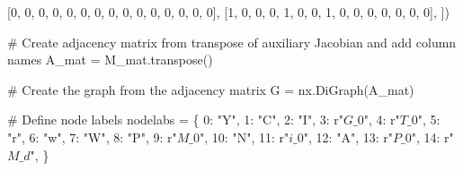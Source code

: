 \documentclass[
  letterpaper,
  DIV=11,
  numbers=noendperiod]{scrreprt}
\newenvironment{Shaded}{\begin{snugshade}}{\end{snugshade}}
\newcommand{\CommentTok}[1]{\textcolor[rgb]{0.37,0.37,0.37}{#1}}
\newcommand{\DecValTok}[1]{\textcolor[rgb]{0.68,0.00,0.00}{#1}}
\newcommand{\NormalTok}[1]{\textcolor[rgb]{0.00,0.23,0.31}{#1}}
\newcommand{\OperatorTok}[1]{\textcolor[rgb]{0.37,0.37,0.37}{#1}}
\newcommand{\StringTok}[1]{\textcolor[rgb]{0.13,0.47,0.30}{#1}}
\newcommand{\VerbatimStringTok}[1]{\textcolor[rgb]{0.13,0.47,0.30}{#1}}
\begin{document}
\begin{tcolorbox}
\begin{Shaded}
\begin{Highlighting}[]
\NormalTok{    [}\DecValTok{0}\NormalTok{, }\DecValTok{0}\NormalTok{, }\DecValTok{0}\NormalTok{, }\DecValTok{0}\NormalTok{, }\DecValTok{0}\NormalTok{, }\DecValTok{0}\NormalTok{, }\DecValTok{0}\NormalTok{, }\DecValTok{0}\NormalTok{, }\DecValTok{0}\NormalTok{, }\DecValTok{0}\NormalTok{, }\DecValTok{0}\NormalTok{, }\DecValTok{0}\NormalTok{, }\DecValTok{0}\NormalTok{, }\DecValTok{0}\NormalTok{, }\DecValTok{0}\NormalTok{],}
\NormalTok{    [}\DecValTok{1}\NormalTok{, }\DecValTok{0}\NormalTok{, }\DecValTok{0}\NormalTok{, }\DecValTok{0}\NormalTok{, }\DecValTok{1}\NormalTok{, }\DecValTok{0}\NormalTok{, }\DecValTok{0}\NormalTok{, }\DecValTok{1}\NormalTok{, }\DecValTok{0}\NormalTok{, }\DecValTok{0}\NormalTok{, }\DecValTok{0}\NormalTok{, }\DecValTok{0}\NormalTok{, }\DecValTok{0}\NormalTok{, }\DecValTok{0}\NormalTok{, }\DecValTok{0}\NormalTok{],}
\NormalTok{])}

\CommentTok{\# Create adjacency matrix from transpose of auxiliary Jacobian and add column names}
\NormalTok{A\_mat }\OperatorTok{=}\NormalTok{ M\_mat.transpose()}

\CommentTok{\# Create the graph from the adjacency matrix}
\NormalTok{G }\OperatorTok{=}\NormalTok{ nx.DiGraph(A\_mat)}


\CommentTok{\# Define node labels}
\NormalTok{nodelabs }\OperatorTok{=}\NormalTok{ \{}
    \DecValTok{0}\NormalTok{: }\StringTok{"Y"}\NormalTok{,}
    \DecValTok{1}\NormalTok{: }\StringTok{"C"}\NormalTok{,}
    \DecValTok{2}\NormalTok{: }\StringTok{"I"}\NormalTok{,}
    \DecValTok{3}\NormalTok{: }\VerbatimStringTok{r"$G\_0$"}\NormalTok{,}
    \DecValTok{4}\NormalTok{: }\VerbatimStringTok{r"$T\_0$"}\NormalTok{,}
    \DecValTok{5}\NormalTok{: }\StringTok{"r"}\NormalTok{,}
    \DecValTok{6}\NormalTok{: }\StringTok{"w"}\NormalTok{,}
    \DecValTok{7}\NormalTok{: }\StringTok{"W"}\NormalTok{,}
    \DecValTok{8}\NormalTok{: }\StringTok{"P"}\NormalTok{,}
    \DecValTok{9}\NormalTok{: }\VerbatimStringTok{r"$M\_0$"}\NormalTok{,}
    \DecValTok{10}\NormalTok{: }\StringTok{"N"}\NormalTok{,}
    \DecValTok{11}\NormalTok{: }\VerbatimStringTok{r"$i\_0$"}\NormalTok{,}
    \DecValTok{12}\NormalTok{: }\StringTok{"A"}\NormalTok{,}
    \DecValTok{13}\NormalTok{: }\VerbatimStringTok{r"$P\_0$"}\NormalTok{,}
    \DecValTok{14}\NormalTok{: }\VerbatimStringTok{r"$M\_d$"}\NormalTok{,}
\NormalTok{\}}


\end{Highlighting}
\end{Shaded}
\end{tcolorbox}
\end{document}
